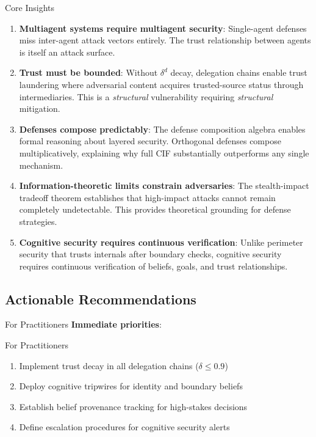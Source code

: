 \documentclass[
  ignorenonframetext,
]{beamer}
\begin{document}
\begin{frame}[allowframebreaks]{Core Insights}
\begin{enumerate}
\item \textbf{Multiagent systems require multiagent security}: Single-agent defenses miss inter-agent attack vectors entirely. The trust relationship between agents is itself an attack surface.

\item \textbf{Trust must be bounded}: Without $\delta^d$ decay, delegation chains enable trust laundering where adversarial content acquires trusted-source status through intermediaries. This is a \textit{structural} vulnerability requiring \textit{structural} mitigation.

\item \textbf{Defenses compose predictably}: The defense composition algebra enables formal reasoning about layered security. Orthogonal defenses compose multiplicatively, explaining why full CIF substantially outperforms any single mechanism.

\item \textbf{Information-theoretic limits constrain adversaries}: The stealth-impact tradeoff theorem establishes that high-impact attacks cannot remain completely undetectable. This provides theoretical grounding for defense strategies.

\item \textbf{Cognitive security requires continuous verification}: Unlike perimeter security that trusts internals after boundary checks, cognitive security requires continuous verification of beliefs, goals, and trust relationships.
\end{enumerate}
\end{frame}

\subsection{Actionable Recommendations}\label{sec:recommendations}

\begin{frame}[allowframebreaks]{For Practitioners}
\protect{}\label{for-practitioners}
\textbf{Immediate priorities}:

\end{frame}

\begin{frame}[allowframebreaks]{For Practitioners}
\begin{enumerate}
\item Implement trust decay in all delegation chains ($\delta \leq 0.9$)
\item Deploy cognitive tripwires for identity and boundary beliefs
\item Establish belief provenance tracking for high-stakes decisions
\item Define escalation procedures for cognitive security alerts
\end{enumerate}

\end{frame}
\end{document}
